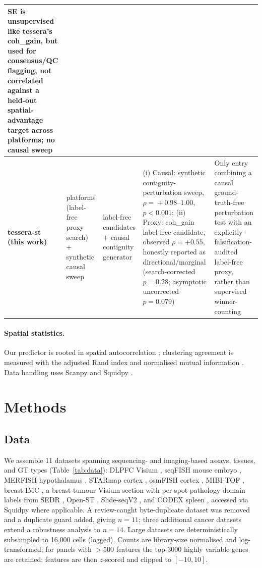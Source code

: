 \documentclass[journal]{IEEEtran}
\begin{document}
\begin{table}[!t]
\begin{tabular}{@{}>{\raggedright\arraybackslash}p{2.6cm}>{\raggedright\arraybackslash}p{2.7cm}>{\raggedright\arraybackslash}p{2.5cm}>{\raggedright\arraybackslash}p{3.9cm}>{\raggedright\arraybackslash}p{3.3cm}@{}}
SE is unsupervised like tessera's coh\_gain, but used for consensus/QC flagging, not correlated against a held-out spatial-advantage target across platforms; no causal sweep \\
\midrule
\textbf{tessera-st (this work)} &
11 platforms (label-free proxy search) + synthetic causal sweep &
6 label-free candidates + causal contiguity generator &
(i) Causal: synthetic contiguity-perturbation sweep, $\rho\!=\!+0.98\text{--}1.00$, $p<0.001$; (ii) Proxy: coh\_gain label-free candidate, observed $\rho=+0.55$, honestly reported as directional/marginal (search-corrected $p=0.28$; asymptotic uncorrected $p=0.079$) &
Only entry combining a causal ground-truth-free perturbation test with an explicitly falsification-audited label-free proxy, rather than supervised winner-counting \\
\bottomrule
\end{tabular}
\end{table}

\paragraph{Spatial statistics.}
Our predictor is rooted in spatial autocorrelation \citep{moran1950}; clustering agreement is measured
with the adjusted Rand index \citep{hubert1985ari} and normalised mutual information \citep{strehl2002nmi}.
Data handling uses Scanpy \citep{wolf2018scanpy} and Squidpy \citep{palla2022squidpy}.

\section{Methods}
\subsection{Data}
We assemble 11 datasets spanning sequencing- and imaging-based assays, tissues, and
GT types (Table~\ref{tab:data}): DLPFC Visium \citep{maynard2021dlpfc}, seqFISH mouse embryo
\citep{lohoff2022seqfish}, MERFISH hypothalamus \citep{moffitt2018merfish}, STARmap cortex
\citep{wang2018starmap}, osmFISH cortex \citep{codeluppi2018osmfish}, MIBI-TOF \citep{keren2018mibitof},
breast IMC \citep{jackson2020imc}, a breast-tumour Visium section \citep{tenx2020brca} with per-spot
pathology-domain labels from SEDR \citep{xu2024sedr}, Open-ST \citep{schott2024openst},
Slide-seqV2 \citep{stickels2021slideseq}, and CODEX spleen \citep{goltsev2018codex}, accessed via
Squidpy \citep{palla2022squidpy} where applicable.
A review-caught byte-duplicate dataset was removed and a duplicate guard
added, giving $n{=}11$; three additional cancer datasets extend a robustness analysis to
$n{=}14$. Large datasets are deterministically subsampled to 16{,}000 cells (logged). Counts are
library-size normalised and log-transformed; for panels with $>500$ features the top-3000
highly variable genes are retained; features are then $z$-scored and clipped to $[-10,10]$.
\end{document}
